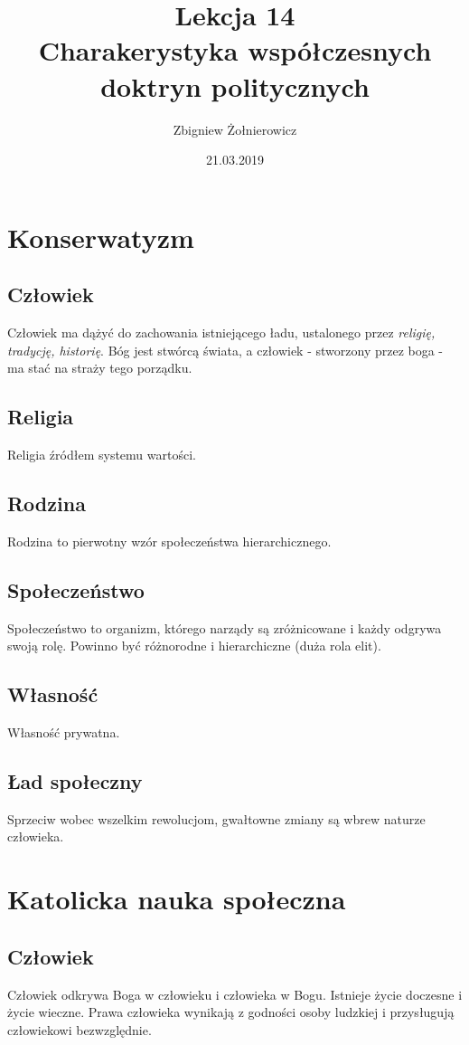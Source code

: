 \documentclass{article}
\begin{document}
\title{
    {\huge Lekcja 14} \\
    {\large Charakerystyka współczesnych doktryn politycznych}
}
\author{Zbigniew Żołnierowicz}
\date{21.03.2019}
\maketitle
\section{Konserwatyzm}
\subsection{Człowiek}
Człowiek ma dążyć do zachowania istniejącego ładu, ustalonego przez \emph{religię, tradycję, historię}.
Bóg jest stwórcą świata, a człowiek - stworzony przez boga - ma stać na straży tego porządku.
\subsection{Religia}
Religia źródłem systemu wartości.
\subsection{Rodzina}
Rodzina to pierwotny wzór społeczeństwa hierarchicznego.
\subsection{Społeczeństwo}
Społeczeństwo to organizm, którego narządy są zróżnicowane i każdy odgrywa swoją rolę.
Powinno być różnorodne i hierarchiczne (duża rola elit).
\subsection{Własność}
Własność prywatna.
\subsection{Ład społeczny}
Sprzeciw wobec wszelkim rewolucjom, gwałtowne zmiany są wbrew naturze człowieka.
\section{Katolicka nauka społeczna}
\subsection{Człowiek}
Człowiek odkrywa Boga w człowieku i człowieka w Bogu. Istnieje życie doczesne i życie wieczne.
Prawa człowieka wynikają z godności osoby ludzkiej i przysługują człowiekowi bezwzględnie.
\end{document}
